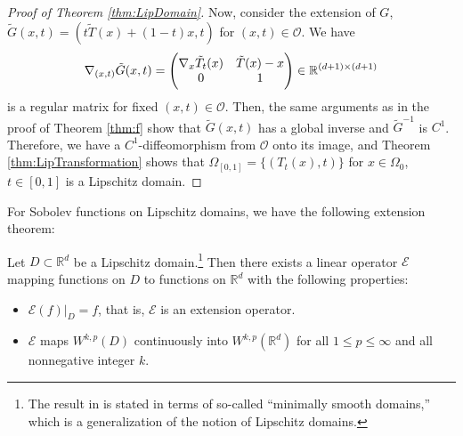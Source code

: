 \begin{proof}[Proof of Theorem \ref{thm:LipDomain}]
    Now, consider the extension of $G$,
    $\tilde{G}(x,t) = (t\tilde{T}(x) + (1-t)x, t)$ for
    $(x,t)\in\mathcal{O}$. We have
    \begin{equation*}
      \nabla_{(x,t)}\tilde{G}(x,t)=\begin{pmatrix}
        \nabla_x \tilde{T}_t(x) & \tilde{T}(x) - x\\
        0 & 1
      \end{pmatrix}\in\mathbb{R}^{(d+1)\times (d+1)}
    \end{equation*}
    is a regular matrix for fixed $(x,t)\in\mathcal{O}$. Then, the same
    arguments as in the proof of Theorem \ref{thm:f} show that
    $\tilde{G}(x,t)$ has a global inverse and $\tilde{G}^{-1}$ is
    $C^1$. Therefore, we have a $C^1$-diffeomorphism from
    $\mathcal{O}$ onto its image, and Theorem
    \ref{thm:LipTransformation} shows that $\Omega_{[0,1]} = \{(T_t(x),t)\}$
    for $x\in\Omega_0$, $t\in[0,1]$ is a Lipschitz domain.
\end{proof}	


For Sobolev functions on Lipschitz domains, we have the following extension theorem:
\begin{theorem}\label{thm:functionExtension}
  Let $D \subset\mathbb{R}^d$ be a Lipschitz
  domain.\footnote{The result in \citet{SteinBook} is stated in
      terms of so-called ``minimally smooth domains,'' which is a
      generalization of the notion of Lipschitz domains.}
  Then there exists a linear operator $\mathcal{E}$ mapping functions
  on $D$ to functions on $\mathbb{R}^d$ with the following properties:
  \begin{itemize}
  \item $\mathcal{E}(f)|_D = f$, that is, $\mathcal{E}$ is an
    extension operator.
  \item $\mathcal{E}$ maps $W^{k,p}(D)$ continuously into
    $W^{k,p}(\mathbb{R}^d)$ for all $1\leq p\leq \infty$ and all
      nonnegative integer $k$.
      
  \end{itemize}
\end{theorem}



